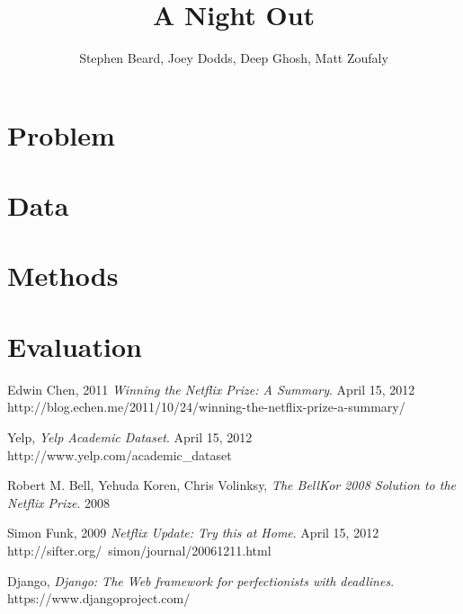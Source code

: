 \documentclass[12pt]{article}
\begin{document}

\title{A Night Out}
\author{Stephen Beard, Joey Dodds, Deep Ghosh, Matt Zoufaly}
\maketitle

\section{Problem}

\newcommand{\bestRMSE}{0.9307 }
\newcommand{\bestRMSEnsp}{0.9307}
\newcommand{\bestK}{48 }
\newcommand{\bestNetflixRMSE}{0.8712 }
\newcommand{\bestNetflixRMSEnsp}{0.8712}
\newcommand{\netDiff}{0.06 }

\newcommand{\numBusCA}{707 } 
\newcommand{\numBusOther}{1745 }
\newcommand{\numBusOthernsp}{1745}
\newcommand{\numBusTotal}{2,452 }
\newcommand{\numUserTotal}{1,799 }

\newcommand{\numRatingCA}{8,970 } 
\newcommand{\numRatingOther}{19,340 }
\newcommand{\numRatingTotal}{28,310 }

\newcommand{\posAccuracy}{92.61\% }
\newcommand{\posInaccuracy}{7.39\% }

\section{Data}


\section{Methods}


\section{Evaluation}


\begin{thebibliography}{9}

  Edwin Chen, 2011
  \emph{Winning the Netflix Prize: A Summary}.
  April 15, 2012
  http://blog.echen.me/2011/10/24/winning-the-netflix-prize-a-summary/

  Yelp, 
  \emph{Yelp Academic Dataset}.
  April 15, 2012
  http://www.yelp.com/academic\_dataset 

  Robert M. Bell, Yehuda Koren, Chris Volinksy,
  \emph{The BellKor 2008 Solution to the Netflix Prize}.
  2008

  Simon Funk, 2009
  \emph{Netflix Update: Try this at Home}.
  April 15, 2012
  http://sifter.org/~simon/journal/20061211.html

 Django,
 \emph{Django: The Web framework for perfectionists with deadlines}.
 https://www.djangoproject.com/

\end{thebibliography}
\end{document}
